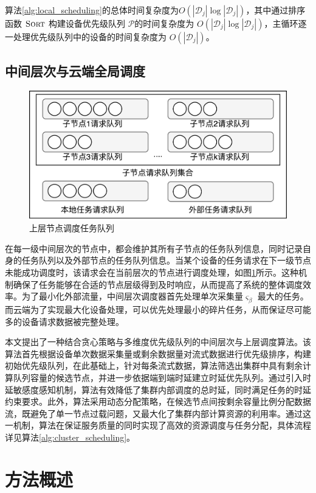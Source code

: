 算法\ref{alg:local_scheduling}的总体时间复杂度为$O(|\mathcal{D}_j| \log |\mathcal{D}_j|)$，其中通过排序函数 $\textsc{Sort}$ 构建设备优先级队列 $\mathcal{P}$的时间复杂度为 $O(|\mathcal{D}_j| \log |\mathcal{D}_j|)$，主循环逐一处理优先级队列中的设备的时间复杂度为 $O(|\mathcal{D}_j|)$。

\subsection{中间层次与云端全局调度}

\begin{figure}[h]
  \centering
  \includegraphics[width=0.8\linewidth]{pics/3-11集群调度.png}
  \caption{上层节点调度任务队列}
  \label{fig:3-11cluster}
\end{figure}

在每一级中间层次的节点中，都会维护其所有子节点的任务队列信息，同时记录自身的任务队列以及外部节点的任务队列信息。当某个设备的任务请求在下一级节点未能成功调度时，该请求会在当前层次的节点进行调度处理，如图\ref{fig:3-11cluster}所示。这种机制确保了任务能够在合适的节点层级得到及时响应，从而提高了系统的整体调度效率。为了最小化外部流量，中间层次调度器首先处理单次采集量$\varsigma_\beta$ 最大的任务。而云端为了实现最大化设备处理，可以优先处理最小的碎片任务，从而保证尽可能多的设备请求数据被完整处理。

本文提出了一种结合贪心策略与多维度优先级队列的中间层次与上层调度算法。该算法首先根据设备单次数据采集量或剩余数据量对流式数据进行优先级排序，构建初始优先级队列，在此基础上，针对每条流式数据，算法筛选出集群中具有剩余计算队列容量的候选节点，并进一步依据端到端时延建立时延优先队列。通过引入时延敏感度感知机制，算法有效降低了集群内部调度的总时延，同时满足任务的时延约束要求。此外，算法采用动态分配策略，在候选节点间按剩余容量比例分配数据流，既避免了单一节点过载问题，又最大化了集群内部计算资源的利用率。通过这一机制，算法在保证服务质量的同时实现了高效的资源调度与任务分配，具体流程详见算法\ref{alg:cluster_scheduling}。

\section{方法概述}

